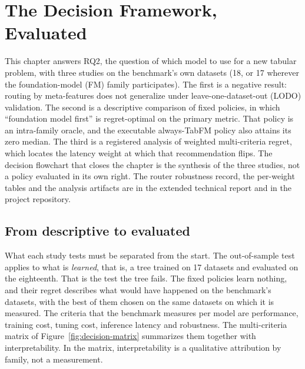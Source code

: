 \chapter{The Decision Framework, Evaluated}
\label{chap:framework}

This chapter answers RQ2, the question of which model to use for a new tabular problem, with three studies on the benchmark's own datasets (18, or 17 wherever the foundation-model (FM) family participates). The first is a negative result: routing by
meta-features does not generalize under leave-one-dataset-out (LODO)
validation. The second is a descriptive comparison of fixed policies, in which ``foundation model first'' is regret-optimal on the primary metric. That policy is an intra-family oracle, and the executable always-TabFM policy also attains its zero median. The third is a registered analysis of weighted multi-criteria
regret, which locates the latency weight at which that recommendation
flips. The decision flowchart that closes the chapter is the synthesis of the three studies, not a policy evaluated in its own right. The router robustness record, the per-weight tables and
the analysis artifacts are in the extended technical report and in
the project repository.

\section{From descriptive to evaluated}
\label{sec:descritivo-validado}

What each study tests must be separated from the start. The out-of-sample test
applies to what is \emph{learned}, that is, a tree trained on 17
datasets and evaluated on the eighteenth. That is the test the tree fails. The fixed policies learn nothing, and their regret describes what would have happened on the benchmark's datasets, with the best of them chosen on the same datasets on which it is measured. The criteria that the benchmark measures per model are performance, training cost, tuning cost, inference latency and robustness. The multi-criteria matrix of Figure~\ref{fig:decision-matrix} summarizes them together with interpretability. In the matrix, interpretability is a qualitative attribution by family, not a measurement.

